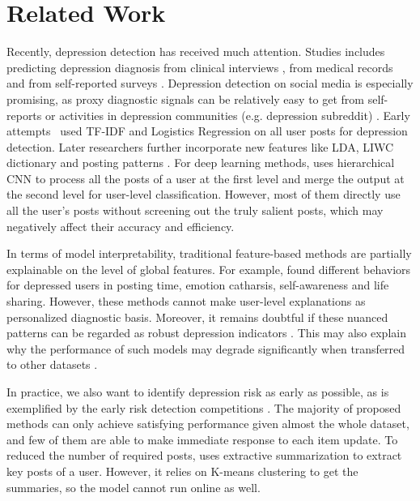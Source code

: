 \section{Related Work}
Recently, depression detection has received much attention. Studies includes predicting depression diagnosis from clinical interviews \citep{gratch2014distress, dinkel2019text}, from medical records \citep{eichstaedt2018facebook} and from self-reported surveys \citep{guntuku2019twitter}. Depression detection on social media is especially promising, as proxy diagnostic signals can be relatively easy to get from self-reports or activities in depression communities (e.g. depression subreddit) \citep{losada2016test,yates2017depression,wolohan2018detecting,ernala2019methodological}. Early attempts~\citep{losada2016test} used TF-IDF and Logistics Regression on all user posts for depression detection. Later researchers further incorporate new features like LDA, LIWC dictionary and posting patterns \citep{trotzek2018utilizing, harrigian2020models}. For deep learning methods, \citet{yates2017depression} uses hierarchical CNN to process all the posts of a user at the first level and merge the output at the second level for user-level classification. However, most of them directly use all the user's posts without screening out the truly salient posts, which may negatively affect their accuracy and efficiency.

In terms of model interpretability, traditional feature-based methods are partially explainable on the level of global features. For example, \citet{shen2017depression} found different behaviors for depressed users in posting time, emotion catharsis, self-awareness and life sharing. However, these methods cannot make user-level explanations as personalized diagnostic basis. Moreover, it remains doubtful if these nuanced patterns can be regarded as robust depression indicators \citep{ernala2019methodological}. This may also explain why the performance of such models may degrade significantly when transferred to other datasets \citep{harrigian2020models}.

In practice, we also want to identify depression risk as early as possible, as is exemplified by the early risk detection competitions \citep{losada2019overview}. The majority of proposed methods can only achieve satisfying performance given almost the whole dataset, and few of them are able to make immediate response to each item update. To reduced the number of required posts, \citet{zogan2021depressionnet} uses extractive summarization to extract key posts of a user. However, it relies on K-means clustering to get the summaries, so the model cannot run online as well. 

